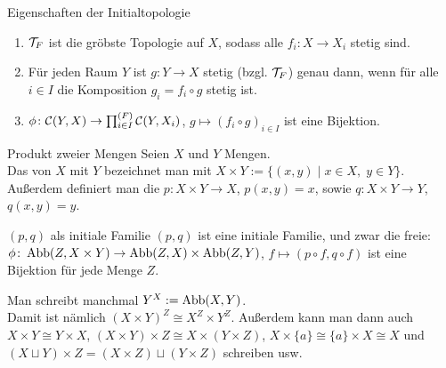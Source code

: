 \begin{Satz}{Eigenschaften der Initialtopologie}
    \begin{enumerate}
        \item
        $\mathcal{T}_F$ ist die gröbste Topologie auf $X$, sodass alle
        $f_i\colon X \rightarrow X_i$ stetig sind.
        
        \item
        Für jeden Raum $Y$ ist $g\colon Y \rightarrow X$ stetig (bzgl. $\mathcal{T}_F$)
        genau dann, wenn für alle $i \in I$ die Komposition
        $g_i = f_i \circ g$ stetig ist.
        
        \item
        $\phi\colon \mathcal{C}(Y, X) \rightarrow
        \prod_{i \in I}^{(F)} \mathcal{C}(Y, X_i)$, $g \mapsto (f_i \circ g)_{i \in I}$
        ist eine Bijektion.
    \end{enumerate}
\end{Satz}

\linie

\begin{Def}{Produkt zweier Mengen}
    Seien $X$ und $Y$ Mengen. \\
    Das  von $X$ mit $Y$ bezeichnet man mit
    $X \times Y := \{(x, y) \;|\; x \in X,\; y \in Y\}$. \\
    Außerdem definiert man die 
    $p\colon X \times Y \rightarrow X$, $p(x, y) = x$,
    sowie $q\colon X \times Y \rightarrow Y$, $q(x, y) = y$.
\end{Def}

\begin{Satz}{$(p, q)$ als initiale Familie}
    $(p, q)$ ist eine initiale Familie,
    und zwar die freie: \\
    $\phi\colon \operatorname{Abb}(Z, X \times Y) \rightarrow \operatorname{Abb}(Z, X) \times \operatorname{Abb}(Z, Y)$,
    $f \mapsto (p \circ f, q \circ f)$ ist eine Bijektion für jede Menge $Z$.
\end{Satz}

\begin{Bem}
    Man schreibt manchmal $Y^X := \operatorname{Abb}(X, Y)$. \\
    Damit ist nämlich $(X \times Y)^Z \cong X^Z \times Y^Z$.
    Außerdem kann man dann auch $X \times Y \cong Y \times X$,
    $(X \times Y) \times Z \cong X \times (Y \times Z)$,
    $X \times \{a\} \cong \{a\} \times X \cong X$ und
    $(X \sqcup Y) \times Z = (X \times Z) \sqcup (Y \times Z)$ schreiben usw.
\end{Bem}

